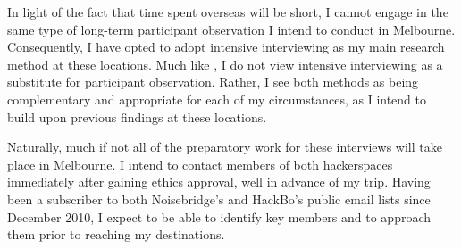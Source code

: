 In light of the fact that time spent overseas will be short, I cannot engage in the same type of long-term participant observation I intend to conduct in Melbourne. Consequently, I have opted to adopt intensive interviewing as my main research method at these locations. Much like \citet{lofland95}, I do not view intensive interviewing as a substitute for participant observation. Rather, I see both methods as being complementary and appropriate for each of my circumstances, as I intend to build upon previous findings at these locations.

Naturally, much if not all of the preparatory work for these interviews will take place in Melbourne. I intend to contact members of both hackerspaces immediately after gaining ethics approval, well in advance of my trip. Having been a subscriber to both Noisebridge's and HackBo's public email lists since December 2010, I expect to be able to identify key members and to approach them prior to reaching my destinations.



